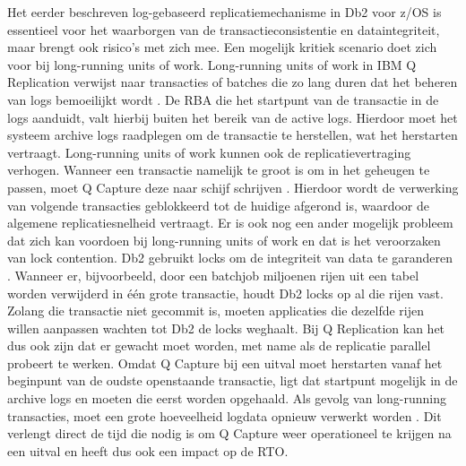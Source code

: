 Het eerder beschreven log-gebaseerd replicatiemechanisme in Db2 voor z/OS is essentieel voor het waarborgen van de transactieconsistentie en dataintegriteit, maar brengt ook risico's met zich mee.
Een mogelijk kritiek scenario doet zich voor bij long-running units of work.
Long-running units of work in IBM Q Replication verwijst naar transacties of batches die zo lang duren dat het beheren van logs bemoeilijkt wordt \autocite{ibm_2026_problems_long_running_units_of_work}.
De RBA die het startpunt van de transactie in de logs aanduidt, valt hierbij buiten het bereik van de active logs.
Hierdoor moet het systeem archive logs raadplegen om de transactie te herstellen, wat het herstarten vertraagt.
Long-running units of work kunnen ook de replicatievertraging verhogen.
Wanneer een transactie namelijk te groot is om in het geheugen te passen, moet Q Capture deze naar schijf schrijven \autocite{ibm_2026_space_requirements_for_spill_files_capture_program}.
Hierdoor wordt de verwerking van volgende transacties geblokkeerd tot de huidige afgerond is, waardoor de algemene replicatiesnelheid vertraagt.
Er is ook nog een ander mogelijk probleem dat zich kan voordoen bij long-running units of work en dat is het veroorzaken van lock contention.
Db2 gebruikt locks om de integriteit van data te garanderen \autocite{ibm_2026_lock_contention_suspension_deadlock_timeout}.
Wanneer er, bijvoorbeeld, door een batchjob miljoenen rijen uit een tabel worden verwijderd in één grote transactie, houdt Db2 locks op al die rijen vast.
Zolang die transactie niet gecommit is, moeten applicaties die dezelfde rijen willen aanpassen wachten tot Db2 de locks weghaalt.
Bij Q Replication kan het dus ook zijn dat er gewacht moet worden, met name als de replicatie parallel probeert te werken.
Omdat Q Capture bij een uitval moet herstarten vanaf het beginpunt van de oudste openstaande transactie, ligt dat startpunt mogelijk in de archive logs en moeten die eerst worden opgehaald.
Als gevolg van long-running transacties, moet een grote hoeveelheid logdata opnieuw verwerkt worden \autocite{ibm_2013_us_reducing_reading_database_logs_persisting_long_running_transactions}.
Dit verlengt direct de tijd die nodig is om Q Capture weer operationeel te krijgen na een uitval en heeft dus ook een impact op de RTO.

